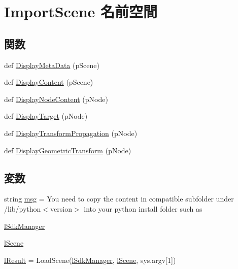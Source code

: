 \hypertarget{namespace_import_scene}{}\section{Import\+Scene 名前空間}
\label{namespace_import_scene}
\subsection*{関数}
\begin{DoxyCompactItemize}
\item 
def \hyperlink{namespace_import_scene_a49ddbc60379793f48374948757134e6a}{Display\+Meta\+Data} (p\+Scene)
\item 
def \hyperlink{namespace_import_scene_a1b0042b2b42d84b0b71bdd29fe59839f}{Display\+Content} (p\+Scene)
\item 
def \hyperlink{namespace_import_scene_a0c11be1356357d5d5c557e376fb6c002}{Display\+Node\+Content} (p\+Node)
\item 
def \hyperlink{namespace_import_scene_ab6985efc732c1079831ca9e90de52b14}{Display\+Target} (p\+Node)
\item 
def \hyperlink{namespace_import_scene_a608e1906853a7d7966b39af7f7693b5d}{Display\+Transform\+Propagation} (p\+Node)
\item 
def \hyperlink{namespace_import_scene_ae7b554bdc3818a88e3a9f35533d2ba17}{Display\+Geometric\+Transform} (p\+Node)
\end{DoxyCompactItemize}
\subsection*{変数}
\begin{DoxyCompactItemize}
\item 
string \hyperlink{namespace_import_scene_a95d1ca9cb3235b20a53cfd5d728d5f8f}{msg} = \textquotesingle{}You need to copy the content in compatible subfolder under /lib/python$<$version$>$ into your python install folder such as \textquotesingle{}
\item 
\hyperlink{namespace_import_scene_a5e1fef1154e08e971acbd290b0736b24}{l\+Sdk\+Manager}
\item 
\hyperlink{namespace_import_scene_a59462472b96f3f51b1cee7797a376ed8}{l\+Scene}
\item 
\hyperlink{namespace_import_scene_a453e3ef1eabe39c820842ba18fca4a92}{l\+Result} = Load\+Scene(\hyperlink{namespace_import_scene_a5e1fef1154e08e971acbd290b0736b24}{l\+Sdk\+Manager}, \hyperlink{namespace_import_scene_a59462472b96f3f51b1cee7797a376ed8}{l\+Scene}, sys.\+argv\mbox{[}1\mbox{]})
\end{DoxyCompactItemize}


